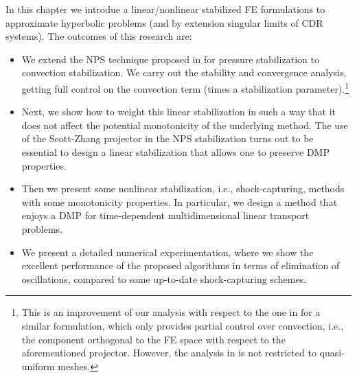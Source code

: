In this chapter we introdue a linear/nonlinear stabilized FE formulations to approximate hyperbolic problems (and by extension singular limits of CDR systems). The outcomes of this research are:
\begin{itemize}
\item  We extend the NPS technique proposed in \cite{badia_stabilized_2012} for pressure stabilization to convection stabilization. We carry out the stability and convergence analysis, getting full control on the convection term (times a stabilization parameter).\footnote{This is an improvement of our analysis with respect to the one in \cite{rebollo_high_2013} for a similar formulation, which only provides partial control over convection, i.e., the component orthogonal to the FE space with respect to the aforementioned projector. However, the analysis in \cite{rebollo_high_2013} is not restricted to quasi-uniform meshes.}
\item Next, we show how to weight this linear stabilization in such a way that it  does not affect the potential  monotonicity of the underlying method. The use of the Scott-Zhang projector in the NPS stabilization turns out to be essential to design a linear stabilization that allows one to preserve DMP properties. 
\item 
Then we present some nonlinear stabilization, i.e., shock-capturing, methods with some  monotonicity properties. In particular, we design a method that enjoys a DMP for time-dependent multidimensional linear transport problems. 
\item   We present a detailed numerical experimentation, where we show the excellent performance of the proposed algorithms in terms of elimination of oscillations, compared to some up-to-date shock-capturing schemes. 
\end{itemize}



